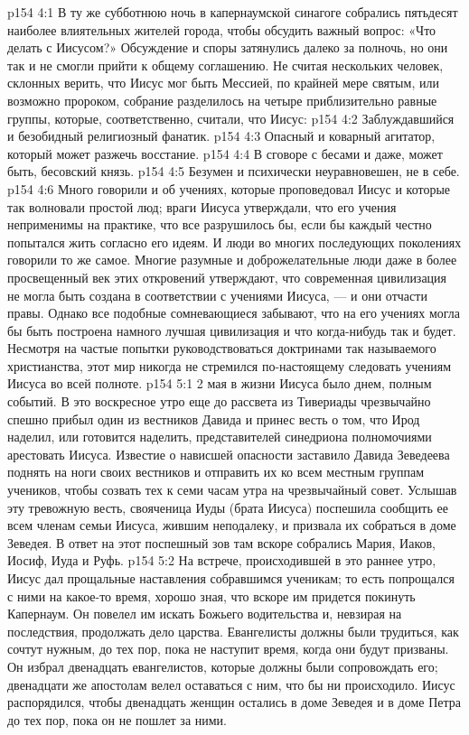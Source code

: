 \vs p154 4:1 В ту же субботнюю ночь в капернаумской синагоге собрались пятьдесят наиболее влиятельных жителей города, чтобы обсудить важный вопрос: «Что делать с Иисусом?» Обсуждение и споры затянулись далеко за полночь, но они так и не смогли прийти к общему соглашению. Не считая нескольких человек, склонных верить, что Иисус мог быть Мессией, по крайней мере святым, или возможно пророком, собрание разделилось на четыре приблизительно равные группы, которые, соответственно, считали, что Иисус:
\vs p154 4:2 \bibnobreakspace Заблуждавшийся и безобидный религиозный фанатик.
\vs p154 4:3 \bibnobreakspace Опасный и коварный агитатор, который может разжечь восстание.
\vs p154 4:4 \bibnobreakspace В сговоре с бесами и даже, может быть, бесовский князь.
\vs p154 4:5 \bibnobreakspace Безумен и психически неуравновешен, не в себе.
\vs p154 4:6 \pc Много говорили и об учениях, которые проповедовал Иисус и которые так волновали простой люд; враги Иисуса утверждали, что его учения неприменимы на практике, что все разрушилось бы, если бы каждый честно попытался жить согласно его идеям. И люди во многих последующих поколениях говорили то же самое. Многие разумные и доброжелательные люди даже в более просвещенный век этих откровений утверждают, что современная цивилизация не могла быть создана в соответствии с учениями Иисуса, --- и они отчасти правы. Однако все подобные сомневающиеся забывают, что на его учениях могла бы быть построена намного лучшая цивилизация и что когда\hyp{}нибудь так и будет. Несмотря на частые попытки руководствоваться доктринами так называемого христианства, этот мир никогда не стремился по\hyp{}настоящему следовать учениям Иисуса во всей полноте.
\vs p154 5:1 2 мая в жизни Иисуса было днем, полным событий. В это воскресное утро еще до рассвета из Тивериады чрезвычайно спешно прибыл один из вестников Давида и принес весть о том, что Ирод наделил, или готовится наделить, представителей синедриона полномочиями арестовать Иисуса. Известие о нависшей опасности заставило Давида Зеведеева поднять на ноги своих вестников и отправить их ко всем местным группам учеников, чтобы созвать тех к семи часам утра на чрезвычайный совет. Услышав эту тревожную весть, свояченица Иуды (брата Иисуса) поспешила сообщить ее всем членам семьи Иисуса, жившим неподалеку, и призвала их собраться в доме Зеведея. В ответ на этот поспешный зов там вскоре собрались Мария, Иаков, Иосиф, Иуда и Руфь.
\vs p154 5:2 На встрече, происходившей в это раннее утро, Иисус дал прощальные наставления собравшимся ученикам; то есть попрощался с ними на какое\hyp{}то время, хорошо зная, что вскоре им придется покинуть Капернаум. Он повелел им искать Божьего водительства и, невзирая на последствия, продолжать дело царства. Евангелисты должны были трудиться, как сочтут нужным, до тех пор, пока не наступит время, когда они будут призваны. Он избрал двенадцать евангелистов, которые должны были сопровождать его; двенадцати же апостолам велел оставаться с ним, что бы ни происходило. Иисус распорядился, чтобы двенадцать женщин остались в доме Зеведея и в доме Петра до тех пор, пока он не пошлет за ними.
